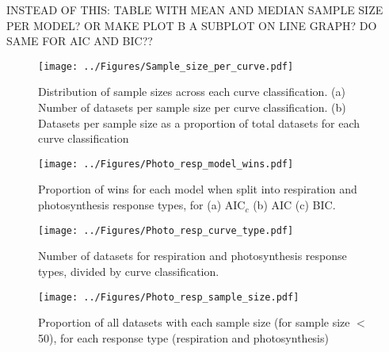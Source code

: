 \documentclass[11pt, a4paper]{article}
\begin{document}
INSTEAD OF THIS: TABLE WITH MEAN AND MEDIAN SAMPLE SIZE PER MODEL? OR MAKE PLOT B A SUBPLOT ON LINE GRAPH? DO SAME FOR AIC AND BIC??
\begin{figure} [H]
	\texttt{[image: ../Figures/Sample\_size\_per\_curve.pdf]}
	\caption{\label{fig:sample_size_per_curve} Distribution of sample sizes across each curve classification. (a) Number of datasets per sample size per curve classification. (b) Datasets per sample size as a proportion of total datasets for each curve classification}
\end{figure}












\begin{figure} [H]
	\texttt{[image: ../Figures/Photo\_resp\_model\_wins.pdf]}
	\caption{\label{fig:photo_resp_model} Proportion of wins for each model when split into respiration and photosynthesis response types, for (a) AIC$_c$ (b) AIC (c) BIC.}
\end{figure}

\begin{figure} [H]
	\texttt{[image: ../Figures/Photo\_resp\_curve\_type.pdf]}
	\caption{\label{fig:photo_resp_curve_type} Number of datasets for respiration and photosynthesis response types, divided by curve classification.}
\end{figure}

\begin{figure} [H]
	\texttt{[image: ../Figures/Photo\_resp\_sample\_size.pdf]}
	\caption{\label{fig:photo_resp_ss} Proportion of all datasets with each sample size (for sample size $<$ 50), for each response type (respiration and photosynthesis)}
\end{figure}
\end{document}
